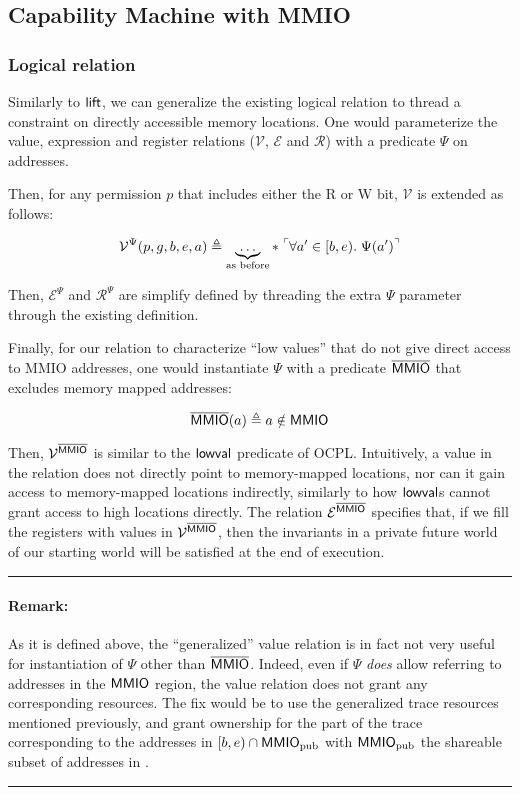 \documentclass{article}
\newcommand{\X}[1]{\ensuremath{\mathrm{#1}}}
\newcommand{\pure}[1]{\tensor[^{\ulcorner}]{#1{}}{^{\urcorner}}} %
\newcommand{\MMIO}{\textlog{MMIO}\xspace}
\newenvironment{remark}
{ \bigskip\hrule\vspace{-1.3em}\nobreak
  \paragraph*{Remark:}}
{\vspace*{0.5em}\hrule\medskip}
\begin{document}
\subsection{Capability Machine with MMIO}

\subsubsection{Logical relation}

\newcommand{\VR}{\mathcal{V}}
\newcommand{\ER}{\mathcal{E}}
\newcommand{\RR}{\mathcal{R}}
\newcommand{\notMMIO}{\overline{\MMIO}}

Similarly to $\textsf{lift}$, we can generalize the existing logical relation
to thread a constraint on directly accessible memory locations. One would
parameterize the value, expression and register relations ($\VR$, $\ER$ and $\RR$)
with a predicate $\Psi$ on addresses.

Then, for any permission $p$ that includes either the R or W bit, $\VR$
is extended as follows:

\[
  \VR^{\Psi}(p, g, b, e, a) \eqdef \underbrace{\ldots}_{\text{as before}} \ast \; \pure{\forall a' \in [b,e).\; \Psi(a')}
\]

Then, $\ER^{\Psi}$ and $\RR^{\Psi}$ are simplify defined by threading the extra
$\Psi$ parameter through the existing definition.

Finally, for our relation to characterize ``low values'' that do not give direct
access to MMIO addresses, one would instantiate $\Psi$ with a predicate
$\notMMIO$ that excludes memory mapped addresses:

\[
  \notMMIO(a) \eqdef a \notin \MMIO
\]

Then, $\VR^{\notMMIO}$ is similar to the $\textsf{lowval}$ predicate of OCPL.
Intuitively, a value in the relation does not directly point to memory-mapped
locations, nor can it gain access to memory-mapped locations indirectly,
similarly to how $\textsf{lowval}$s cannot grant access to high locations
directly. The relation $\ER^{\notMMIO}$ specifies that, if we fill the registers
with values in $\VR^{\notMMIO}$, then the invariants in a private future world
of our starting world will be satisfied at the end of execution.

\begin{remark} As it is defined above, the ``generalized'' value relation
is in fact not very useful for instantiation of $\Psi$ other than $\notMMIO$.
Indeed, even if $\Psi$ \emph{does} allow referring to addresses in the $\MMIO$
region, the value relation does not grant any corresponding resources. The fix
would be to use the generalized trace resources mentioned previously, and grant
ownership for the part of the trace corresponding to the addresses in
$[b,e) \cap \MMIO_{\X{pub}}$ with $\MMIO_{\X{pub}}$ the shareable subset of
addresses in \MMIO.
\end{remark}
\end{document}
